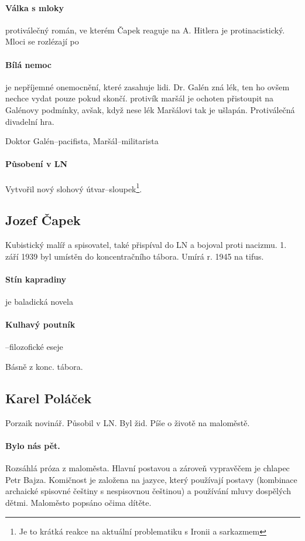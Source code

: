 \documentclass[10pt,a4page,headings,openany,%
oneside
,twocolumn
]{report}
\begin{document}
\paragraph{Válka s mloky} protiválečný román, ve kterém Čapek reaguje na A. Hitlera je protinacistický. Mloci se rozlézají po 

\paragraph{Bílá nemoc} je nepříjemné onemocnění, které zasahuje lidi. Dr. Galén zná lék, ten ho ovšem nechce vydat pouze pokud skončí. protivík maršál je ochoten přistoupit na Galénovy podmínky, avšak, když nese lék Maršálovi tak je ušlapán. Protiválečná divadelní hra.

\textsf{Doktor Galén}--pacifista, \textsf{Maršál}--militarista

\paragraph{Působení v LN} Vytvořil nový slohový útvar--sloupek\footnote{Je to krátká reakce na aktuální problematiku s Ironii a sarkazmem}. 

\subsection{Jozef Čapek}

Kubistický malíř a spisovatel, také přispíval do LN a bojoval proti nacizmu. 1. září 1939 byl umístěn do koncentračního tábora. Umírá r. 1945 na tifus.

\paragraph{Stín kapradiny} je baladická novela

\paragraph{Kulhavý poutník}--filozofické eseje

Básně z konc. tábora.

\subsection{Karel Poláček}
Porzaik novinář. Působil v LN. Byl žid. Píše o životě na maloměstě.

\paragraph{Bylo nás pět.} Rozsáhlá próza z maloměsta. Hlavní postavou a zároveň vypravěčem je chlapec Petr Bajza. Komičnost je založena na jazyce, který používají postavy (kombinace archaické spisovné češtiny s nespisovnou češtinou) a používání mluvy dospělých dětmi. Maloměsto popsáno očima dítěte.
\end{document}
